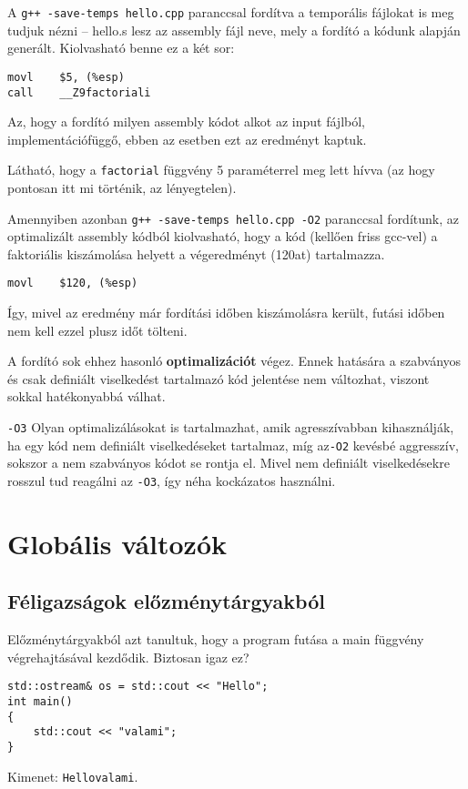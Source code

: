 \documentclass[../cpp_book/cpp_book.tex]{subfiles}
\begin{document}
	A \texttt{g++ -save-temps hello.cpp} paranccsal fordítva a temporális fájlokat is meg tudjuk nézni -- hello.s lesz az assembly fájl neve, mely a fordító a kódunk alapján generált. Kiolvasható benne ez a két sor:
	\begin{lstlisting}[style = customasm]
movl 	$5, (%esp)
call	__Z9factoriali
	\end{lstlisting}
	\begin{note}
		Az, hogy a fordító milyen assembly kódot alkot az input fájlból, implementációfüggő, ebben az esetben ezt az eredményt kaptuk.
	\end{note}
	Látható, hogy a \texttt{factorial} függvény 5 paraméterrel meg lett hívva (az hogy pontosan itt mi történik, az lényegtelen).
	
	\medskip
	Amennyiben azonban \texttt{g++ -save-temps hello.cpp -O2} paranccsal fordítunk, az optimalizált assembly kódból kiolvasható, hogy a kód (kellően friss gcc-vel) a faktoriális kiszámolása helyett a végeredményt (120at) tartalmazza. 
	\begin{lstlisting}[style = customasm]
movl	$120, (%esp)
	\end{lstlisting}
	Így, mivel az eredmény már fordítási időben kiszámolásra került, futási időben nem kell ezzel plusz időt tölteni.
	
	A fordító sok ehhez hasonló \textbf{optimalizációt} végez. Ennek hatására a szabványos és csak definiált viselkedést tartalmazó kód jelentése nem változhat, viszont sokkal hatékonyabbá válhat.
	\begin{note}
		\texttt{-O3} Olyan optimalizálásokat is tartalmazhat, amik agresszívabban kihasználják, ha egy kód nem definiált viselkedéseket tartalmaz, míg az\texttt{-O2} kevésbé aggresszív, sokszor a nem szabványos kódot se rontja el. Mivel nem definiált viselkedésekre rosszul tud reagálni az \texttt{-O3}, így néha kockázatos használni.
	\end{note}

	\section{Globális változók}
	\subsection{Féligazságok előzménytárgyakból}
	Előzménytárgyakból azt tanultuk, hogy a program futása a main függvény végrehajtásával kezdődik. Biztosan igaz ez?
	\begin{lstlisting}
std::ostream& os = std::cout << "Hello";
int main()
{
	std::cout << "valami";
}
	\end{lstlisting}
	Kimenet: \texttt{Hellovalami}.
	\medskip
	
\end{document}
